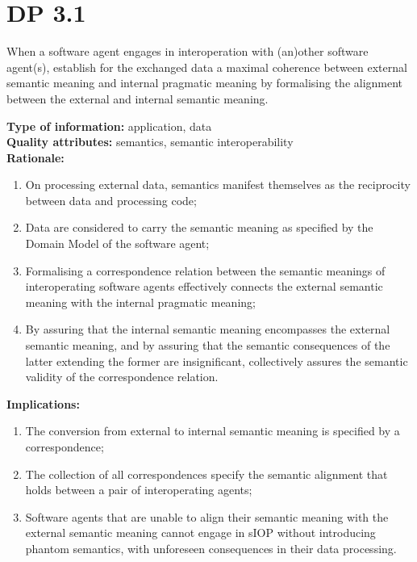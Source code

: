 \documentclass[sort&compress,preprint,authoryear,3p,twocolumn]{elsarticle}
\begin{document}
\hypertarget{dp-3.1}{%
\section{DP 3.1}\label{dp-3.1}}

\begin{mmdp}\label{dp:alignment}

When a software agent engages in interoperation with (an)other software agent(s), establish for the exchanged data a maximal coherence between external semantic meaning and internal pragmatic meaning by formalising the alignment between the external and internal semantic meaning.   

\textbf{Type of information:} application, data  \\
\textbf{Quality attributes:} semantics, semantic interoperability   \\
\textbf{Rationale:}
\begin{enumerate}
  \item On processing external data, semantics manifest themselves as the reciprocity between data and processing code;
  \item Data are considered to carry the semantic meaning as specified by the Domain Model of the software agent;
  \item Formalising a correspondence relation between the semantic meanings of interoperating software agents effectively connects the external semantic meaning with the internal pragmatic meaning;
  \item By assuring that the internal semantic meaning encompasses the external semantic meaning, and by assuring that the semantic consequences of the latter extending the former are insignificant, collectively assures the semantic validity of the correspondence relation.
\end{enumerate}
\textbf{Implications:}
\begin{enumerate}
  \item The conversion from external to internal semantic meaning is specified by a correspondence;
  \item The collection of all correspondences specify the semantic alignment that holds between a pair of interoperating agents;
  \item Software agents that are unable to align their semantic meaning with the external semantic meaning cannot engage in sIOP without introducing phantom semantics, with unforeseen consequences in their data processing.
\end{enumerate}  
\end{mmdp}
\end{document}
